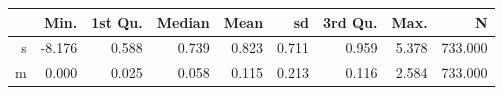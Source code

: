 \begin{table}[ht]
\centering
\begin{tabular}{rrrrrrrrr}
  \hline
 & Min. & 1st Qu. & Median & Mean & sd & 3rd Qu. & Max. & N \\ 
  \hline
s & -8.176 & 0.588 & 0.739 & 0.823 & 0.711 & 0.959 & 5.378 & 733.000 \\ 
  m & 0.000 & 0.025 & 0.058 & 0.115 & 0.213 & 0.116 & 2.584 & 733.000 \\ 
   \hline
\end{tabular}
\end{table}
